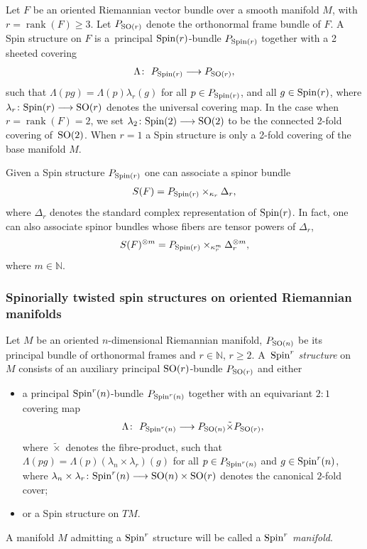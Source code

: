 \documentclass[pdftex]{sigma}
\newcommand{\lra}{\longrightarrow}
\numberwithin{equation}{section}
\begin{document}
Let $F$ be an oriented Riemannian vector bundle over a smooth manifold $M$, with \mbox{$r\!=\!\operatorname{rank}(F)\!\geq\! 3$}. Let $P_{{\rm SO}(r)}$ denote the orthonormal frame bundle of $F$. A Spin structure on $F$ is a~principal ${\rm Spin}(r)$-bundle $P_{{\rm Spin}(r)}$ together with a 2 sheeted covering
\begin{gather*} \Lambda\colon \ P_{{\rm Spin}(r)}\lra P_{{\rm SO}(r)},\end{gather*}
such that $\Lambda(pg)=\Lambda(p)\lambda_r(g)$ for all $p\in P_{{\rm Spin}(r)}$, and all $g\in {\rm Spin}(r)$, where $\lambda_r\colon {\rm Spin}(r)\lra {\rm SO}(r)$ denotes the universal covering map. In the case when $r=\operatorname{rank}(F)=2$, we set $\lambda_2\colon {\rm Spin}(2)\lra {\rm SO}(2)$ to be the connected 2-fold covering of~${\rm SO}(2)$. When $r=1$ a Spin structure is only a 2-fold covering of the base manifold $M$.

Given a Spin structure $P_{{\rm Spin}(r)}$ one can associate a spinor bundle
\begin{gather*} S(F) = P_{{\rm Spin}(r)}\times_{\kappa_r} \Delta_r,\end{gather*}
where $\Delta_r$ denotes the standard complex representation of ${\rm Spin}(r)$. In fact, one can also associate spinor bundles whose fibers are tensor powers of $\Delta_r$,
\begin{gather*} S(F)^{\otimes m}=P_{{\rm Spin}(r)}\times_{\kappa_r^m} \Delta_r^{\otimes m},\end{gather*}
where $m\in\mathbb{N}$.

\subsubsection{Spinorially twisted spin structures on oriented Riemannian manifolds}

\begin{Definition}Let $M$ be an oriented $n$-dimensional Riemannian manifold, $P_{{\rm SO}(n)}$ be its principal bundle of orthonormal frames and $r\in\mathbb{N}$, $r\geq 2$. A~{\em ${\rm Spin}^r$ structure} on $M$ consists of an auxiliary principal ${\rm SO}(r)$-bundle $P_{{\rm SO}(r)}$ and either
\begin{itemize}\itemsep=0pt
\item a principal ${\rm Spin}^r(n)$-bundle $P_{{\rm Spin}^{r}(n)}$ together with an equivariant $2:1$ covering map
\begin{gather*} \Lambda\colon \ P_{{\rm Spin}^{r}(n)}\lra P_{{\rm SO}(n)} \tilde{\times} P_{{\rm SO}(r)},\end{gather*}
where $\tilde{\times}$ denotes the fibre-product, such that $\Lambda(pg)=\Lambda(p)(\lambda_n\times\lambda_r)(g)$ for all $p\in P_{{\rm Spin}^{r}(n)}$ and
$g\in {\rm Spin}^{r}(n)$, where $\lambda_n\times\lambda_r\colon {\rm Spin}^r(n)\lra {\rm SO}(n)\times {\rm SO}(r)$ denotes the canonical $2$-fold cover;
\item or a Spin structure on $TM$.
\end{itemize}

A manifold $M$ admitting a ${\rm Spin}^r$ structure will be called a {\em ${\rm Spin}^r$ manifold}.
\end{Definition}
\end{document}
